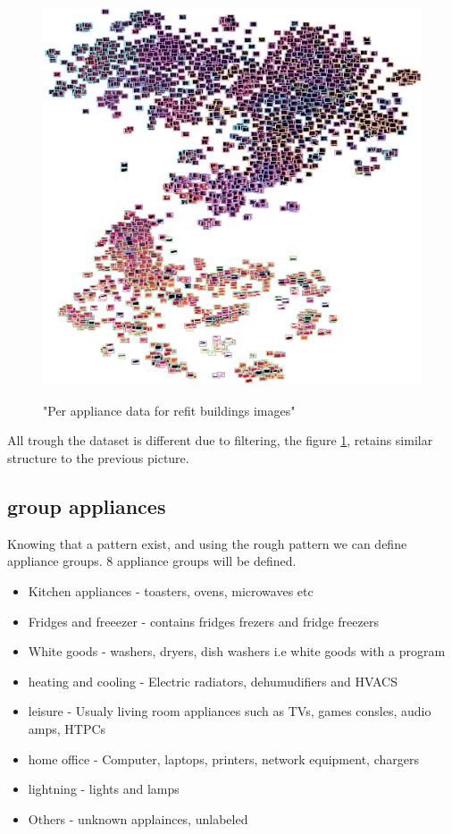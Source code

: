 \begin{figure}[H]
	\centering
	\caption{"Per appliance data for refit buildings images"}
	\includegraphics[width=.9\textwidth]{Figures/TSNE/TSNE_results/all/img_scatter_allall_reduced_max.png}
	\label{fig:tsne_papb_img_scatter_all_reduced}
\end{figure}

All trough the dataset is different due to filtering,
the figure \ref{fig:tsne_papb_img_scatter_all_reduced},
retains similar structure to the previous picture. 

\subsection{group appliances}

Knowing that a pattern exist, and using the rough pattern 
we can define appliance groups. 
8 appliance groups will be defined.

\begin{itemize}
    \item Kitchen appliances - toasters, ovens, microwaves etc
    \item Fridges and freeezer  - contains fridges frezers and fridge freezers
    \item White goods - washers, dryers, dish washers i.e white goods with a program
    \item heating and cooling - Electric radiators, dehumudifiers and HVACS
    \item leisure - Usualy living room appliances such as TVs, games consles, audio amps, HTPCs
    \item home office - Computer, laptops, printers, network equipment, chargers
    \item lightning - lights and lamps
    \item Others - unknown applainces, unlabeled
\end{itemize}

